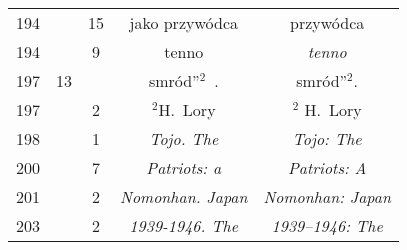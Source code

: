 \documentclass[a4paper,11pt]{article}
\numberwithin{equation}{section}
\begin{document}
\begin{center}
\begin{tabular}{|c|c|c|c|c|}
    194 & & 15 & jako przywódca & przywódca \\
    194 & &  9 & tenno & \textit{tenno} \\
    197 & 13 & & smród”$^{ 2 }$~. & smród”$^{ 2 }$. \\
    197 & &  2 & $^{ 2 }$H.~Lory & $^{ 2 }$ H.~Lory \\
    198 & &  1 & \textit{Tojo. The} & \textit{Tojo: The} \\
    200 & &  7 & \textit{Patriots: a} & \textit{Patriots: A} \\
    201 & &  2 & \textit{Nomonhan. Japan} & \textit{Nomonhan: Japan} \\
    203 & &  2 & \textit{1939-1946. The} & \textit{1939--1946: The} \\
    \hline
  \end{tabular}





  \newpage


\end{center}
\end{document}
